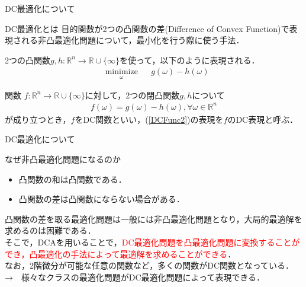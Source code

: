 \documentclass[aspectratio=169, dvipdfmx, 10.5pt]{beamer} %
\newcommand{\red}[1]{\textcolor{red}{#1}}
\newcommand{\blue}[1]{\textcolor{blue!80!black}{#1}}
\DeclareMathOperator{\minimize}{minimize}
\begin{document}
\begin{frame}{DC最適化について}
	\begin{block}{DC最適化とは}
		目的関数が\alert{2つの凸関数の差(Difference of Convex Function)}で表現される非凸最適化問題について，最小化を行う際に使う手法．
	\end{block}
    2つの凸関数$g, h: \mathbb{R}^n \to \mathbb{R} \cup \{ \infty \}$を使って，以下のように表現される．
	\begin{align}
		\label{DCFunc}
		& && \underset{\omega}{\minimize} && g(\omega) - h(\omega) &&
	\end{align}
	\begin{screen}
        関数 $f:\mathbb{R}^n \to \mathbb{R} \cup \{ \infty \}$に対して，2つの閉凸関数$g, h$について
        \begin{align}
            \label{DCFunc2}
            f(\omega) = g(\omega) - h(\omega), \forall \omega \in \mathbb{R}^n
        \end{align}
        が成り立つとき，$f$を\blue{DC関数}といい，(\ref{DCFunc2})の表現を\blue{$f$のDC表現}と呼ぶ．
    \end{screen}
\end{frame}

\begin{frame}{DC最適化について}
    \begin{itembox}[l]{なぜ非凸最適化問題になるのか}
        \begin{itemize}
            \item 凸関数の和は凸関数である．
            \item 凸関数の差は凸関数にならない場合がある．
        \end{itemize}
    \end{itembox}
    凸関数の差を取る最適化問題は一般には非凸最適化問題となり，大局的最適解を求めるのは困難である．\\
    そこで，DCAを用いることで，\red{DC最適化問題を凸最適化問題に変換することができ，凸最適化の手法によって最適解を求めることができる}．\\
    \vspace{\baselineskip}
    なお，2階微分が可能な任意の関数など，多くの関数がDC関数となっている．\\
    →　様々なクラスの最適化問題がDC最適化問題によって表現できる．
\end{frame}
\end{document}
